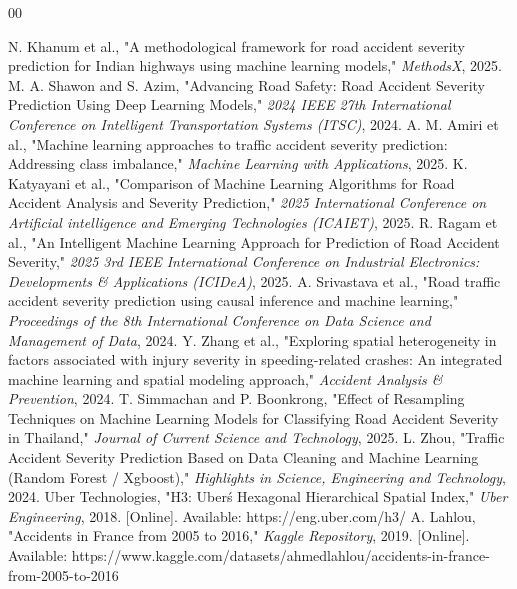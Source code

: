 \documentclass[conference]{IEEEtran}
\begin{document}
\begin{thebibliography}{00}

 N. Khanum et al., "A methodological framework for road accident severity prediction for Indian highways using machine learning models," \textit{MethodsX}, 2025.
 M. A. Shawon and S. Azim, "Advancing Road Safety: Road Accident Severity Prediction Using Deep Learning Models," \textit{2024 IEEE 27th International Conference on Intelligent Transportation Systems (ITSC)}, 2024.
 A. M. Amiri et al., "Machine learning approaches to traffic accident severity prediction: Addressing class imbalance," \textit{Machine Learning with Applications}, 2025.
 K. Katyayani et al., "Comparison of Machine Learning Algorithms for Road Accident Analysis and Severity Prediction," \textit{2025 International Conference on Artificial intelligence and Emerging Technologies (ICAIET)}, 2025.
 R. Ragam et al., "An Intelligent Machine Learning Approach for Prediction of Road Accident Severity," \textit{2025 3rd IEEE International Conference on Industrial Electronics: Developments \& Applications (ICIDeA)}, 2025.
 A. Srivastava et al., "Road traffic accident severity prediction using causal inference and machine learning," \textit{Proceedings of the 8th International Conference on Data Science and Management of Data}, 2024.
 Y. Zhang et al., "Exploring spatial heterogeneity in factors associated with injury severity in speeding-related crashes: An integrated machine learning and spatial modeling approach," \textit{Accident Analysis \& Prevention}, 2024.
 T. Simmachan and P. Boonkrong, "Effect of Resampling Techniques on Machine Learning Models for Classifying Road Accident Severity in Thailand," \textit{Journal of Current Science and Technology}, 2025.
 L. Zhou, "Traffic Accident Severity Prediction Based on Data Cleaning and Machine Learning (Random Forest / Xgboost)," \textit{Highlights in Science, Engineering and Technology}, 2024.
 Uber Technologies, "H3: Uber\'s Hexagonal Hierarchical Spatial Index," \textit{Uber Engineering}, 2018. [Online]. Available: https://eng.uber.com/h3/
 A. Lahlou, "Accidents in France from 2005 to 2016," \textit{Kaggle Repository}, 2019. [Online]. Available: https://www.kaggle.com/datasets/ahmedlahlou/accidents-in-france-from-2005-to-2016

\end{thebibliography}
\end{document}
